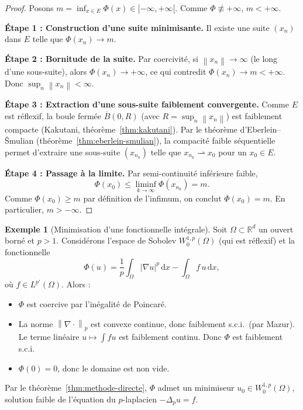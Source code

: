 \documentclass[a4paper,12pt]{book}
\newcommand{\R}{\mathbb{R}}
\newcommand{\dd}{\mathrm{d}}
\newcommand{\norm}[1]{\left\| #1 \right\|}
\newcommand{\abs}[1]{\left| #1 \right|}
\newcommand{\weakto}{\rightharpoonup}
\theoremstyle{definition}
\newtheorem{exemple}[definition]{Exemple}
\theoremstyle{plain}
\theoremstyle{remark}
\begin{document}
\begin{proof}
Posons $m = \inf_{x \in E} \Phi(x) \in [-\infty, +\infty[$. Comme $\Phi \not\equiv +\infty$,
$m < +\infty$.

\medskip
\noindent\textbf{Étape 1 : Construction d'une suite minimisante.}
Il existe une suite $(x_n)$ dans $E$ telle que $\Phi(x_n) \to m$.

\medskip
\noindent\textbf{Étape 2 : Bornitude de la suite.}
Par coercivité, si $\norm{x_n} \to \infty$ (le long d'une sous-suite), alors
$\Phi(x_n) \to +\infty$, ce qui contredit $\Phi(x_n) \to m < +\infty$.
Donc $\sup_n \norm{x_n} < \infty$.

\medskip
\noindent\textbf{Étape 3 : Extraction d'une sous-suite faiblement convergente.}
Comme $E$ est réflexif, la boule fermée $\overline{B}(0, R)$ (avec
$R = \sup_n \norm{x_n}$) est faiblement compacte (Kakutani, théorème~\ref{thm:kakutani}).
Par le théorème d'Eberlein--\v{S}mulian (théorème~\ref{thm:eberlein-smulian}),
la compacité faible séquentielle permet d'extraire une sous-suite
$(x_{n_k})$ telle que $x_{n_k} \weakto x_0$ pour un $x_0 \in E$.

\medskip
\noindent\textbf{Étape 4 : Passage à la limite.}
Par semi-continuité inférieure faible,
\[
  \Phi(x_0) \le \liminf_{k \to \infty} \Phi(x_{n_k}) = m.
\]
Comme $\Phi(x_0) \ge m$ par définition de l'infimum, on conclut $\Phi(x_0) = m$.
En particulier, $m > -\infty$.
\end{proof}

\begin{exemple}[Minimisation d'une fonctionnelle intégrale]
\label{ex:minimisation-integrale}
Soit $\Omega \subset \R^d$ un ouvert borné et $p > 1$. Considérons l'espace de
Sobolev $W_0^{1,p}(\Omega)$ (qui est réflexif) et la
fonctionnelle
\[
  \Phi(u) = \frac{1}{p} \int_\Omega \abs{\nabla u}^p \, \dd x - \int_\Omega f \, u \, \dd x,
\]
où $f \in L^{p'}(\Omega)$. Alors :
\begin{itemize}
  \item $\Phi$ est coercive par l'inégalité de Poincaré.
  \item La norme $\norm{\nabla \cdot}_p$ est convexe continue, donc faiblement
    s.c.i.\ (par Mazur). Le terme linéaire $u \mapsto \int f u$ est faiblement continu.
    Donc $\Phi$ est faiblement s.c.i.
  \item $\Phi(0) = 0$, donc le domaine est non vide.
\end{itemize}
Par le théorème~\ref{thm:methode-directe}, $\Phi$ admet un minimiseur $u_0 \in W_0^{1,p}(\Omega)$,
solution faible de l'équation du $p$-laplacien
$-\Delta_p u = f$.
\end{exemple}
\end{document}
